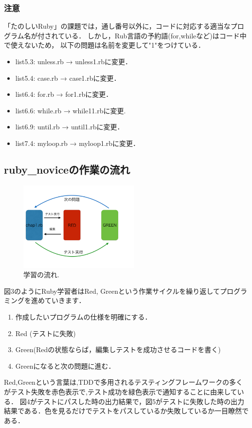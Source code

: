 \subsubsection{注意}
「たのしいRuby」の課題では，通し番号以外に，コードに対応する適当なプログラム名が付されている．
しかし，Rub言語の予約語(for,whileなど)はコード中で使えないため，
以下の問題は名前を変更して"1"をつけている．

\begin{itemize}
\item list5.3:  unless.rb → unless1.rbに変更．
\item list5.4:  case.rb → case1.rbに変更．
\item list6.4:  for.rb → for1.rbに変更．
\item list6.6:  while.rb → while11.rbに変更.
\item list6.9:  until.rb → until1.rbに変更．
\item list7.4:  myloop.rb → myloop1.rbに変更．
\end{itemize}
\subsection{ruby\_noviceの作業の流れ}
\begin{figure}[htbp]\begin{center}
\includegraphics[width=6cm,bb=0 0 442 432]{../figs/./ruby_novice.003.jpg}
\caption{学習の流れ.}
\label{default}\end{center}\end{figure}
図3のようにRuby学習者はRed, Greenという作業サイクルを繰り返してプログラミングを進めていきます．

\begin{enumerate}
\item 作成したいプログラムの仕様を明確にする．
\item Red (テストに失敗)
\item Green(Redの状態ならば，編集しテストを成功させるコードを書く)
\item Greenになると次の問題に進む．
\end{enumerate}
Red,Greenという言葉は,TDDで多用されるテスティングフレームワークの多くがテスト失敗を赤色表示で,テスト成功を緑色表示で通知することに由来している．
図4がテストにパスした時の出力結果で，図5がテストに失敗した時の出力結果である．色を見るだけでテストをパスしているか失敗しているか一目瞭然である．

